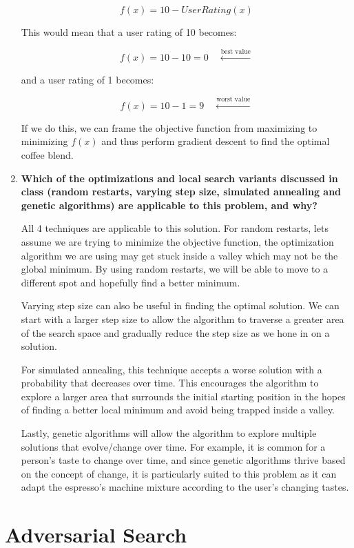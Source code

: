 \documentclass[a4paper]{article}
\begin{document}
\begin{sloppypar}
\begin{enumerate}[start=9,label=Q\arabic*,left=0pt]
    \[f(x) = 10 - User Rating(x)\]

    This would mean that a user rating of 10 becomes:

    \[ f(x) = 10 - 10 = 0 \quad \xleftarrow{\text{best value}} \]

    and a user rating of 1 becomes:

    \[ f(x) = 10 - 1 = 9 \quad \xleftarrow{\text{worst value}} \]

    If we do this, we can frame the objective function from maximizing to minimizing $f(x)$ and thus perform gradient descent
    to find the optimal coffee blend.

    \item \textbf{Which of the optimizations and local search variants discussed in class (random restarts, varying step size, simulated annealing and genetic algorithms) are applicable to this problem, and why?}
    \par All 4 techniques are applicable to this solution. For random restarts, lets assume we are trying to minimize the objective
    function, the optimization algorithm we are using may get stuck inside a valley which may not be the global minimum. By using random
    restarts, we will be able to move to a different spot and hopefully find a better minimum.

    Varying step size can also be useful in finding the optimal solution. We can start with a larger step size to allow the algorithm
    to traverse a greater area of the search space and gradually reduce the step size as we hone in on a solution. 

    For simulated annealing, this technique accepts a worse solution with a probability that decreases over time. This encourages the algorithm
    to explore a larger area that surrounds the initial starting position in the hopes of finding a better local minimum and avoid being trapped
    inside a valley. 

    Lastly, genetic algorithms will allow the algorithm to explore multiple solutions that evolve/change over time. For example,
    it is common for a person's taste to change over time, and since genetic algorithms thrive based on the concept of change, it is particularly suited
    to this problem as it can adapt the espresso's machine mixture according to the user's changing tastes.
\end{enumerate}

\section{Adversarial Search}


\end{sloppypar}
\end{document}
